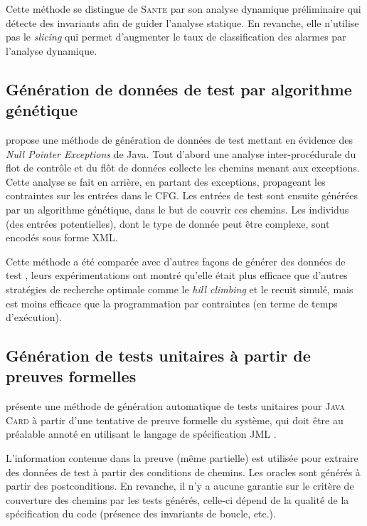 \documentclass[french]{spimufcphdthesis}
\begin{document}
Cette méthode se distingue de \textsc{Sante} \cite{SANTE} par son analyse
dynamique préliminaire qui détecte des invariants afin de guider l'analyse
statique. En revanche, elle n'utilise pas le {\em slicing} qui permet
d'augmenter le taux de classification des alarmes par l'analyse dynamique.

\subsection{Génération de données de test par algorithme génétique}

\cite{search-based-testing-of-NPE} propose une méthode de génération de données
de test mettant en évidence des {\em Null Pointer Exceptions} de Java. Tout
d'abord une analyse inter-procédurale du flot de contrôle et du flôt de données
collecte les chemins menant aux exceptions. Cette analyse se fait en arrière, en
partant des exceptions, propageant les contraintes sur les entrées dans le CFG.
Les entrées de test sont ensuite générées par un algorithme génétique, dans le
but de couvrir ces chemins. Les individus (des entrées potentielles), dont le
type de donnée peut être complexe, sont encodés sous forme XML.

Cette méthode a été comparée avec d'autres façons de générer des données de
test \cite{DbZ-exception-raising-via-branch-coverage}, leurs expérimentations
ont montré qu'elle était plus efficace que d'autres stratégies de recherche
optimale comme le {\em hill climbing} et le recuit simulé, mais est moins
efficace que la programmation par contraintes (en terme de temps d'exécution). 

\subsection{Génération de tests unitaires à partir de preuves formelles}

\cite{generating-unit-tests-from-formal-proofs} présente une méthode de
génération automatique de tests unitaires pour \textsc{Java Card} à partir d'une
tentative de preuve formelle du système, qui doit être au préalable annoté en
utilisant le langage de spécification \textsc{JML} \cite{JML}.

L'information contenue dans la preuve (même partielle) est utilisée
pour extraire des données de test à partir des conditions de chemins. Les
oracles sont générés à partir des postconditions. En revanche, il n'y a aucune
garantie sur le critère de couverture des chemins par les tests générés,
celle-ci dépend de la qualité de la spécification du code (présence des
invariants de boucle, etc.).
\end{document}
